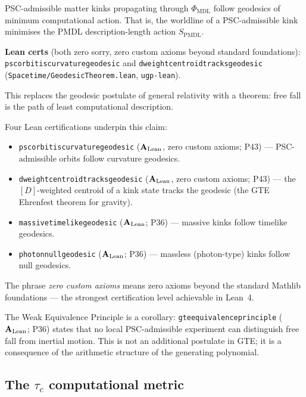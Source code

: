 \documentclass[11pt,openany]{book}
\theoremstyle{remark}
\newcommand{\lean}[1]{%
  \penalty-100
  \begingroup\def\_{\textunderscore\allowbreak}\texttt{#1}\endgroup}
\newcommand{\CatAL}{\ensuremath{\textbf{A}_{\rm Lean}}}
\begin{document}
\begin{tcolorbox}[colback=orange!5,colframe=orange!60,title={Theorem: The Geodesic Computation Theorem (\CatAL, zero custom axioms)}]
PSC-admissible matter kinks propagating through $\Phi_{\mathrm{MDL}}$ follow geodesics of
minimum computational action. That is, the worldline of a PSC-admissible kink minimises
the PMDL description-length action $S_{\mathrm{PMDL}}$.

\textbf{Lean certs} (both zero sorry, zero custom axioms beyond standard foundations):
\lean{psc\_orbit\_is\_curvature\_geodesic} and \lean{dweight\_centroid\_tracks\_geodesic}
(\texttt{Spacetime/GeodesicTheorem.lean}, \texttt{ugp-lean}).

This replaces the geodesic postulate of general relativity with a theorem: free fall is the
path of least computational description.
\end{tcolorbox}

Four Lean certifications underpin this claim:
\begin{itemize}
\item \lean{psc\_orbit\_is\_curvature\_geodesic}
  (\CatAL, zero custom axioms; P43) --- PSC-admissible orbits follow curvature geodesics.
\item \lean{dweight\_centroid\_tracks\_geodesic}
  (\CatAL, zero custom axioms; P43) --- the $[D]$-weighted centroid of a kink
  state tracks the geodesic (the GTE Ehrenfest theorem for gravity).
\item \lean{massive\_timelike\_geodesic} (\CatAL; P36) --- massive kinks follow
  timelike geodesics.
\item \lean{photon\_null\_geodesic} (\CatAL; P36) --- massless (photon-type) kinks
  follow null geodesics.
\end{itemize}
The phrase \emph{zero custom axioms} means zero axioms beyond the standard Mathlib
foundations --- the strongest certification level achievable in Lean~4.

The Weak Equivalence Principle is a corollary:
\lean{gte\_equivalence\_principle} (\CatAL; P36) states that no local
PSC-admissible experiment can distinguish free fall from inertial motion.
This is not an additional postulate in GTE; it is a consequence of the arithmetic
structure of the generating polynomial.

\subsection*{The $\tau_c$ computational metric}
\end{document}
